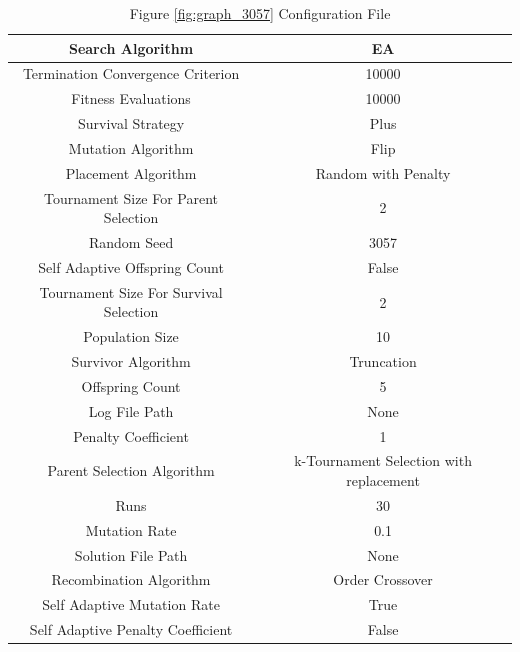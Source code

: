 \documentclass{standalone}
\begin{document}
\begin{table}[!htb]
	\centering
	\caption{Figure \ref{fig:graph_3057} Configuration File}
	\label{tab:graph_3057}
	\begin{tabular}{| c | c |}
		\hline
		Search Algorithm		& EA		 \\
		\hline
		Termination Convergence Criterion		& 10000		 \\
		\hline
		Fitness Evaluations		& 10000		 \\
		\hline
		Survival Strategy		& Plus		 \\
		\hline
		Mutation Algorithm		& Flip		 \\
		\hline
		Placement Algorithm		& Random with Penalty		 \\
		\hline
		Tournament Size For Parent Selection		& 2		 \\
		\hline
		Random Seed		& 3057		 \\
		\hline
		Self Adaptive Offspring Count		& False		 \\
		\hline
		Tournament Size For Survival Selection		& 2		 \\
		\hline
		Population Size		& 10		 \\
		\hline
		Survivor Algorithm		& Truncation		 \\
		\hline
		Offspring Count		& 5		 \\
		\hline
		Log File Path		& None		 \\
		\hline
		Penalty Coefficient		& 1		 \\
		\hline
		Parent Selection Algorithm		& k-Tournament Selection with replacement		 \\
		\hline
		Runs		& 30		 \\
		\hline
		Mutation Rate		& 0.1		 \\
		\hline
		Solution File Path		& None		 \\
		\hline
		Recombination Algorithm		& Order Crossover		 \\
		\hline
		Self Adaptive Mutation Rate		& True		 \\
		\hline
		Self Adaptive Penalty Coefficient		& False		 \\
		\hline
	\end{tabular}
\end{table}
\end{document}
